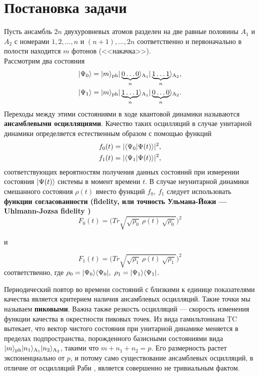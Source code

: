 \section{Постановка задачи}\label{sec:ch1/sec1}
\vspace{-1em}
\noindent Пусть ансамбль $2n$ двухуровневых атомов разделен на две равные половины $A_1$ и $A_2$ с номерами $1,2,...,n$ и $(n+1),\dots,2n$ соответственно и первоначально в полости находится $m$ фотонов (<<накачка>>).
\\[12pt]
Рассмотрим два состояния
\begin{equation}\label{main}
	\begin{split}
		|\Psi_0\rangle=|m\rangle_{\mathrm{ph}}|\protect\underbrace{0\dots0}_{n}\rangle_{\mathrm{A_{1}}} |\protect\underbrace{1\dots1}_{n}\rangle_{\mathrm{A_{2}}},\\
		|\Psi_1\rangle=|m\rangle_{\mathrm{ph}}|\protect\underbrace{1\dots1}_{n}\rangle_{\mathrm{A_{1}}} |\protect\underbrace{0\dots0}_{n}\rangle_{\mathrm{A_{2}}}.
	\end{split}
\end{equation}
Переходы между этими состояниями в ходе квантовой динамики называются \textbf{ансамблевыми осцилляциями}. Качество таких осцилляций в случае унитарной динамики определяется естественным образом с помощью функций 
\begin{equation}
	\begin{split}
		\displaystyle f_0(t)=|\langle \Psi_0 |\Psi(t)\rangle |^2,\\f_1(t)=|\langle \Psi_1 |\Psi(t)\rangle |^2,
	\end{split}
\end{equation}
соответствующих вероятностям получения данных состояний при измерении состояния $|\Psi(t)\rangle$ системы в момент времени $t$. В случае неунитарной динамики смешанного состояния $\rho(t)$ вместо функций $f_0, \ f_1$ следует использовать \textbf{функции согласованности (fidelity, или точность Ульмана-Йожи --- Uhlmann-Jozsa fidelity \cite{fidelity_1,fidelity_2,fidelity_3,fidelity_4})}
\[
F_0(t)=\biggl(Tr\sqrt{\sqrt{\rho_0}\ \rho(t)\ \sqrt{\rho_0}}\biggr)^{2}
\]
\begin{center}и\end{center}
\[
F_1(t)=\biggl(Tr\sqrt{\sqrt{\rho_1}\ \rho(t)\ \sqrt{\rho_1}}\biggr)^{2}
\]
соответственно, где $\rho_0=|\Psi_0\ra\la\Psi_0|,\ \rho_1=|\Psi_1\ra\la\Psi_1|$. 

Периодический повтор во времени состояний с близкими к единице показателями качества является критерием наличия ансамблевых осцилляций. Такие точки мы называем \textbf{пиковыми}. Важна также резкость осцилляций --- скорость изменения функции качества в окрестности пиковых точек. Из вида гамильтониана TC вытекает, что вектор чистого состояния при унитарной динамике меняется в пределах подпространства, порожденного базисными состояниями вида $|m\rangle_{\mathrm{ph}}|n_1\rangle_{\mathrm{A_{1}}}|n_2\rangle_{\mathrm{A_{2}}}$, такими что $m+ n_{1}+n_{2}=p$. Его размерность растет экспоненциально от $p$, и потому само существование ансамблевых осцилляций, в отличие от осцилляций Раби \cite{rabi_1,rabi_2,rabi_3}, является совершенно не тривиальным фактом. 

